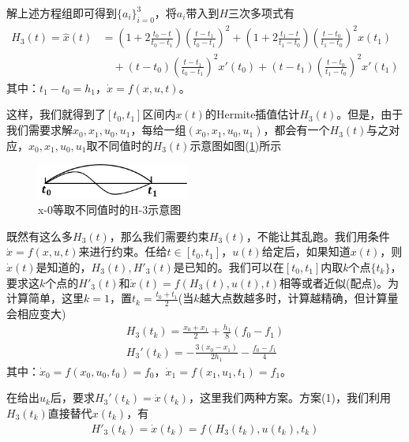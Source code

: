             解上述方程组即可得到$\{a_i\}_{i=0}^3$，将$a_i$带入到$H$三次多项式有
            \begin{align*}
            H_3(t) = \hat{x}(t) & =  \left( 1+2\frac{t_0-t}{t_0-t_1} \right) \left( \frac{t-t_1}{t_0-t_1} \right) ^2 + \left( 1+2\frac{t_1-t}{t_1-t_0} \right) \left( \frac{t-t_0}{t_1-t_0} \right) ^2x(t_1)\\
            & \quad + (t-t_0) \left( \frac{t-t_1}{t_0-t_1} \right) ^2x'(t_0)+(t-t_1) \left( \frac{t-t_0}{t_1-t_0} \right) ^2 x'(t_1)
            \end{align*}
            其中：$t_1-t_0 = h_1$，$\dot{x} = f(x,u,t)$。
            \par
            这样，我们就得到了$[t_0,t_1]$区间内$x(t)$的Hermite插值估计$H_3(t)$。但是，由于我们需要求解$x_0,x_1,u_0,u_1$，每给一组$(x_0,x_1,u_0,u_1)$，都会有一个$H_3(t)$与之对应，$x_0,x_1,u_0,u_1$取不同值时的$H_3(t)$示意图如图(\ref{fig:x-0等取不同值时的H-3示意图})所示
            \begin{figure}[H]
            \centering
            \includegraphics[width=5cm]{images/x_0H_3.jpg}
            \caption{x-0等取不同值时的H-3示意图}
            \label{fig:x-0等取不同值时的H-3示意图}
            \end{figure}
            \par
            既然有这么多$H_3(t)$，那么我们需要约束$H_3(t)$，不能让其乱跑。我们用条件$\dot{x} = f(x,u,t)$来进行约束。任给$t\in [t_0,t_1]$，$u(t)$给定后，如果知道$x(t)$，则$\dot{x}(t)$是知道的，$H_3(t),H'_3(t)$是已知的。我们可以在$[t_0,t_1]$内取$k$个点$\{t_k\}$，要求这$k$个点的$H'_3(t)$和$\dot{x}(t) = f(H_3(t),u(t),t)$相等或者近似(配点)。为计算简单，这里$k=1$，置$t_k = \frac{t_0+t_1}{2}$(当$k$越大点数越多时，计算越精确，但计算量会相应变大)
            \begin{align*}
            H_3(t_k) = \frac{x_0+x_1}{2}+\frac{h_1}{8}(f_0-f_1)\\
            H_3'(t_k) = -\frac{3(x_0-x_1)}{2h_1} - \frac{f_0-f_1}{4}
            \end{align*}
            其中：$\dot{x}_0= f(x_0,u_0,t_0) = f_0$，$\dot{x}_1 = f(x_1,u_1,t_1) = f_1$。
            \par
            在给出$u_k$后，要求$H_3'(t_k) = \dot{x}(t_k)$，这里我们两种方案。方案(1)，我们利用$H_3(t_k)$直接替代$x(t_k)$，有
            \begin{align*}
            H'_3(t_k) = \dot{x}(t_k) = f(H_3(t_k),u(t_k),t_k)
            \end{align*}
